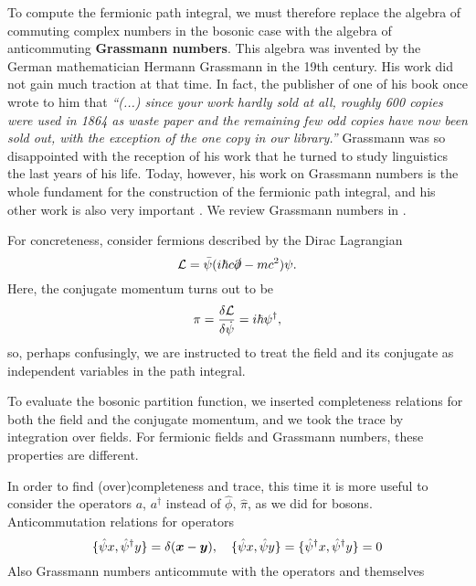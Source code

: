 To compute the fermionic path integral, we must therefore replace the algebra of commuting complex numbers in the bosonic case with the algebra of anticommuting \textbf{Grassmann numbers}.
This algebra was invented by the German mathematician Hermann Grassmann in the 19th century.
His work did not gain much traction at that time.
In fact, the publisher of one of his book once wrote to him that
\emph{``(...) since your work hardly sold at all, roughly 600 copies were used in 1864 as waste paper and the remaining few odd copies have now been sold out, with the exception of the one copy in our library.''}
Grassmann was so disappointed with the reception of his work that he turned to study linguistics the last years of his life.
Today, however, his work on Grassmann numbers is the whole fundament for the construction of the fermionic path integral, and his other work is also very important .
We review Grassmann numbers in .

For concreteness, consider fermions described by the Dirac Lagrangian
\begin{equation}
	\mathcal{L} = \bar{\psi} (i \hbar c \slashed\partial - m c^2) \psi .
\end{equation}
Here, the conjugate momentum turns out to be
\begin{equation}
	\pi = \fdv{\lagr}{\dot\psi} = i \hbar \psi^\dagger ,
\label{eq:tft:dirac_conjugate_momentum}
\end{equation}
so, perhaps confusingly, we are instructed to treat the field and its conjugate as independent variables in the path integral.

To evaluate the bosonic partition function, we inserted completeness relations for both the field and the conjugate momentum, and we took the trace by integration over fields.
For fermionic fields and Grassmann numbers, these properties are different.


In order to find (over)completeness and trace, this time it is more useful to consider the operators $a$, $a^\dagger$ instead of $\hat{\phi}$, $\hat{\pi}$, as we did for bosons.
Anticommutation relations for operators
\begin{equation}
	\{ \hat\psi{x} , \hat\psi^\dagger{y} \} = \delta({\bm{x}}-{\bm{y}}) ,
	\quad
	\{ \hat\psi{x} , \hat\psi{y} \} = 
	\{ \hat\psi^\dagger{x} , \hat\psi^\dagger{y} \} = 0
\end{equation}
Also Grassmann numbers anticommute with the operators and themselves

